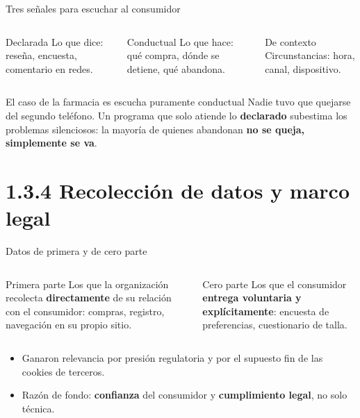 \documentclass[aspectratio=169,xcolor=dvipsnames]{beamer}
\begin{document}
\begin{frame}{Tres señales para escuchar al consumidor}
\begin{columns}[T]
  \begin{block}{Declarada}
    \small Lo que dice: reseña, encuesta, comentario en redes.
  \end{block}
  \begin{exampleblock}{Conductual}
    \small Lo que hace: qué compra, dónde se detiene, qué abandona.
  \end{exampleblock}
  \begin{block}{De contexto}
    \small Circunstancias: hora, canal, dispositivo.
  \end{block}
\end{columns}
\vspace{8pt}
\begin{alertblock}{El caso de la farmacia es escucha puramente conductual}
  Nadie tuvo que quejarse del segundo teléfono. Un programa que solo atiende lo \textbf{declarado} subestima los problemas silenciosos: la mayoría de quienes abandonan \textbf{no se queja, simplemente se va}.
\end{alertblock}
\end{frame}

\section[Datos y ley]{1.3.4 Recolección de datos y marco legal}

\begin{frame}{Datos de primera y de cero parte}
\begin{columns}[T]
  \begin{block}{Primera parte}
    \small Los que la organización recolecta \textbf{directamente} de su relación con el consumidor: compras, registro, navegación en su propio sitio.
  \end{block}
  \begin{exampleblock}{Cero parte}
    \small Los que el consumidor \textbf{entrega voluntaria y explícitamente}: encuesta de preferencias, cuestionario de talla.
  \end{exampleblock}
\end{columns}
\vspace{6pt}
\begin{itemize}
  \small
  \item Ganaron relevancia por presión regulatoria y por el supuesto fin de las cookies de terceros.
  \item Razón de fondo: \textbf{confianza} del consumidor y \textbf{cumplimiento legal}, no solo técnica.
\end{itemize}
\end{frame}
\end{document}
